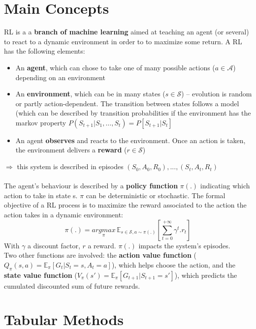\documentclass[a4paper]{article}
\begin{document}
\section{Main Concepts}
RL is a a \textbf{branch of machine learning} aimed at teaching an agent (or several) to react to a dynamic environment in order to to maximize some return. A RL has the following elements:
\begin{itemize}
  \item An \textbf{agent}, which can chose to take one of many possible actions ($a \in \mathcal{A}$) depending on an environment
  \item An \textbf{environment}, which can be in many states ($s \in \mathcal{S}$) -- evolution is random or partly action-dependent. The transition between states follows a model (which can be described by transition probabilities if the environment has the markov property $P(S_{t+1}|S_1,…,S_t) = P[S_{t+1}|S_t]$
  \item An agent \textbf{observes} and reacts to the environment. Once an action is taken, the environment delivers a \textbf{reward} ($r\in\mathcal{S}$) 
\end{itemize}
$\Rightarrow$ this system is described in episodes $(S_0, A_0, R_0), ..., (S_t, A_t, R_t)$
\\\\
The agent's behaviour is described by a \textbf{policy function} $\pi(.)$ indicating which action to take in state s. $\pi$ can be deterministic or stochastic. The formal objective of a RL process is to maximize the reward associated to the action the action takes in a dynamic environment:
\\
$$\pi(.) = \underset{\pi}{argmax}\,\mathbb{E}_{s\in\mathcal{S}, a\sim\pi(.)}[\underset{t=0}{\overset{+\infty}{\sum}}\gamma^t.r_t]$$
With $\gamma$ a discount factor, $r$ a reward. $\pi(.)$ impacts the system's episodes.
\\
Two other functions are involved: the \textbf{action value function} ($Q_{\pi}(s, a) = \mathbb{E}_\pi[G_t|S_t=s, A_t=a]$), which helps choose the action, and the \textbf{state value function} ($V_\pi(s')=\mathbb{E}_\pi[G_{t+1}|S_{t+1}=s']$), which predicts the cumulated discounted sum of future rewards.


\section{Tabular Methods}
\end{document}
